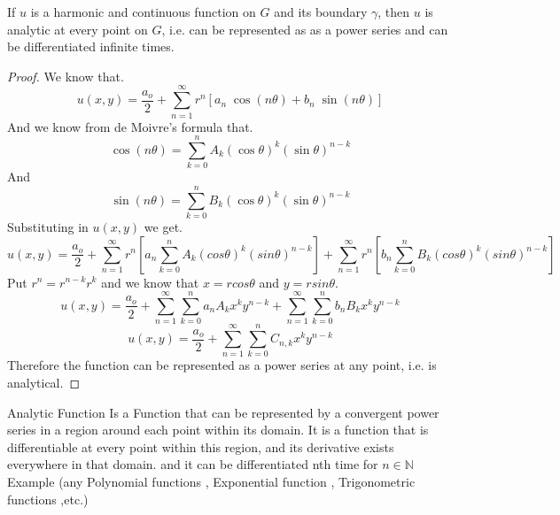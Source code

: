 \documentclass[]{article}
\begin{document}
\begin{theorem}
    If $u$ is a harmonic and continuous function on $G$ and its boundary $\gamma$, then $u$ is analytic at every point on $G$, i.e. can be represented as as a power series and can be differentiated infinite times.    
\end{theorem}
\begin{proof}
    We know that.       
    \[
        u(x,y) = \frac{a_o}{2} + \sum_{n=1}^{\infty} r^n[a_n\;\cos(n\theta)+b_n\;\sin(n\theta)]    
    \]
    And we know from de Moivre's formula that.
    \[
        \cos(n\theta) = \sum_{k=0}^{n} A_k {(\cos\theta)}^k {(\sin\theta)}^{n-k}    
    \]
    And
    \[
        \sin(n\theta) =  \sum_{k=0}^{n} B_k {(\cos\theta)}^k {(\sin\theta)}^{n-k}    
    \]
    Substituting in $u(x,y)$ we get.
    \[
        u(x,y) = \frac{a_o}{2} + \sum_{n=1}^{\infty} r^n\left[a_n\sum_{k=0}^{n} A_k (cos\theta)^k (sin\theta)^{n-k}\right] + \sum_{n=1}^{\infty} r^n\left[b_n\sum_{k=0}^{n} B_k (cos\theta)^k (sin\theta)^{n-k}\right]    
    \]
    Put $r^n = r^{n-k}r^k $ and we know that $x = rcos\theta$ and $y=rsin\theta$.
    \[
        u(x,y) = \frac{a_o}{2} + \sum_{n=1}^{\infty}\sum_{k=0}^{n} a_n A_k x^k y^{n-k} + \sum_{n=1}^{\infty}\sum_{k=0}^{n}b_n B_k x^k y^{n-k}    
    \]
    \[
        u(x,y) = \frac{a_o}{2} + \sum_{n=1}^{\infty}\sum_{k=0}^{n} C_{n,k} x^k y^{n-k}
    \]
    Therefore the function can be represented as a power series at any point, i.e. is analytical.
\end{proof}
\begin{minipage}[b]{1\textwidth}
    \begin{enrichment*}{Analytic Function}
        Is a Function that can be represented by a convergent power series in a region around each point within its domain. It is a function that is differentiable at every point within this region, and its derivative exists everywhere in that domain. 
        and it can be differentiated nth time for $n \in \mathbb{N}$
        \\
        Example (any Polynomial functions , Exponential function , Trigonometric functions ,etc.)
    \end{enrichment*}        
\end{minipage}
\newpage
\setcounter{equation}{0}
\end{document}
